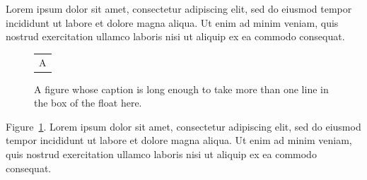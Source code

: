 \documentclass{article}
\begin{document}
Lorem ipsum dolor sit amet, consectetur adipiscing elit, sed do eiusmod tempor incididunt ut labore et dolore magna aliqua. Ut enim ad minim veniam, quis nostrud exercitation ullamco laboris nisi ut aliquip ex ea commodo consequat.
\begin{figure}[H]
\centering
\begin{tabular}{c}A\end{tabular}
\caption{A figure whose caption is long enough to take more than one line in the box of the float here.}\label{f1}
\end{figure}
Figure~\ref{f1}. Lorem ipsum dolor sit amet, consectetur adipiscing elit, sed do eiusmod tempor incididunt ut labore et dolore magna aliqua. Ut enim ad minim veniam, quis nostrud exercitation ullamco laboris nisi ut aliquip ex ea commodo consequat.
\end{document}
